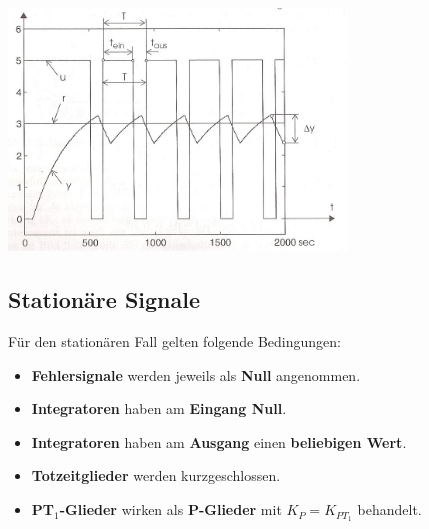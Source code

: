 		\begin{minipage}{9cm}
		\includegraphics[width=9cm]{./bilder/ZweipunktreglerTotglied_dia.jpg}			
        \end{minipage}

	\subsection{Stationäre Signale}
	Für den stationären Fall gelten folgende Bedingungen:
	\begin{itemize}
    	\item \textbf{Fehlersignale} werden jeweils als \textbf{Null} angenommen.
    	\item \textbf{Integratoren} haben am \textbf{Eingang Null}.
    	\item \textbf{Integratoren} haben am \textbf{Ausgang} einen \textbf{beliebigen Wert}.
    	\item \textbf{Totzeitglieder} werden kurzgeschlossen.
    	\item \textbf{PT$_1$-Glieder} wirken als \textbf{P-Glieder} mit $K_P = K_{PT_1}$ behandelt.
  	\end{itemize}